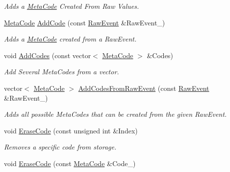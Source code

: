 \begin{DoxyCompactItemize}
\begin{DoxyCompactList}\small\item\em Adds a \hyperlink{classMezzanine_1_1MetaCode}{MetaCode} Created From Raw Values. \item\end{DoxyCompactList}\item 
\hyperlink{classMezzanine_1_1MetaCode}{MetaCode} \hyperlink{classMezzanine_1_1EventUserInput_a8a4eaa043a7e88ced6a0cb4e5d817291}{AddCode} (const \hyperlink{namespaceMezzanine_ae8d4c0ab783af89a250b0225b75753e5}{RawEvent} \&RawEvent\_\-)
\begin{DoxyCompactList}\small\item\em Adds a \hyperlink{classMezzanine_1_1MetaCode}{MetaCode} created from a RawEvent. \item\end{DoxyCompactList}\item 
void \hyperlink{classMezzanine_1_1EventUserInput_ab6ed3c37497ddc7f1985e7ae216ea774}{AddCodes} (const vector$<$ \hyperlink{classMezzanine_1_1MetaCode}{MetaCode} $>$ \&Codes)
\begin{DoxyCompactList}\small\item\em Add Several MetaCodes from a vector. \item\end{DoxyCompactList}\item 
vector$<$ \hyperlink{classMezzanine_1_1MetaCode}{MetaCode} $>$ \hyperlink{classMezzanine_1_1EventUserInput_ac24aaefbb290b4452886ba3f616f0d94}{AddCodesFromRawEvent} (const \hyperlink{namespaceMezzanine_ae8d4c0ab783af89a250b0225b75753e5}{RawEvent} \&RawEvent\_\-)
\begin{DoxyCompactList}\small\item\em Adds all possible MetaCodes that can be created from the given RawEvent. \item\end{DoxyCompactList}\item 
void \hyperlink{classMezzanine_1_1EventUserInput_aede2a3b45edd2442eeac34814b9c03cc}{EraseCode} (const unsigned int \&Index)
\begin{DoxyCompactList}\small\item\em Removes a specific code from storage. \item\end{DoxyCompactList}\item 
void \hyperlink{classMezzanine_1_1EventUserInput_aecca59338264fd49cf96661f28f02471}{EraseCode} (const \hyperlink{classMezzanine_1_1MetaCode}{MetaCode} \&Code\_\-)

\end{DoxyCompactItemize}
